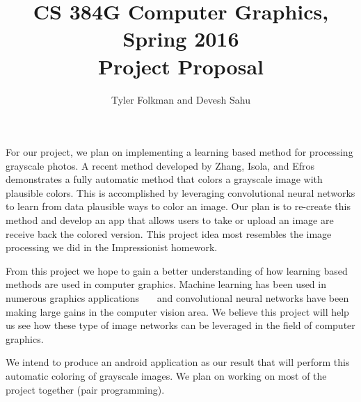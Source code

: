 \documentclass[11pt,letterpaper]{article}
\author{Tyler Folkman and Devesh Sahu}
\title{CS 384G Computer Graphics, Spring 2016 \\ Project Proposal}
\begin{document}
\maketitle

For our project, we plan on implementing a learning based method for processing grayscale photos. A recent method developed by Zhang, Isola, and Efros~\cite{zhang2016colorful} demonstrates a fully automatic method that colors a grayscale image with plausible colors. This is accomplished by leveraging convolutional neural networks to learn from data plausible ways to color an image. Our plan is to re-create this method and develop an app that allows users to take or upload an image are receive back the colored version. This project idea most resembles the image processing we did in the Impressionist homework.

From this project we hope to gain a better understanding of how learning based methods are used in computer graphics. Machine learning has been used in numerous graphics applications~\cite{grochow2004style}~\cite{barbivc2004segmenting}~\cite{matusik2003data} and convolutional neural networks have been making large gains in the computer vision area. We believe this project will help us see how these type of image networks can be leveraged in the field of computer graphics. 

We intend to produce an android application as our result that will perform this automatic coloring of grayscale images. We plan on working on most of the project together (pair programming).






\end{document}
